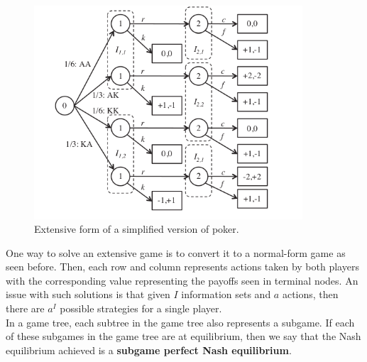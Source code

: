 \documentclass[11pt]{article}
\begin{document}
\begin{figure}
    \centering
    \includegraphics[width=10cm]{images/sequential_gt.png}
    \caption{Extensive form of a simplified version of poker.}
    \label{fig:sgt}
\end{figure}

One way to solve an extensive game is to convert it to a normal-form game as seen before. Then, each row and column represents actions taken by both players with the corresponding value representing the payoffs seen in terminal nodes. An issue with such solutions is that given $I$ information sets and $a$ actions, then there are $a^I$ possible strategies for a single player.\\

In a game tree, each subtree in the game tree also represents a subgame. If each of these subgames in the game tree are at equilibrium, then we say that the Nash equilibrium achieved is a \textbf{subgame perfect Nash equilibrium}. 
\end{document}
